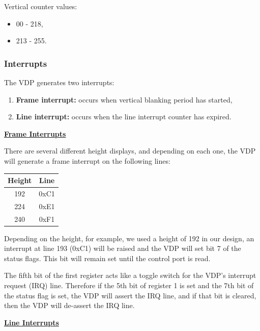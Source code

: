 \documentclass{article}
\begin{document}
Vertical counter values:

\vspace{-0.1cm}
\begin{itemize}
    \item 00  - 218,
    \item 213 - 255.
\end{itemize}

\subsubsection{Interrupts}

The VDP generates two interrupts:

\vspace{-0.1cm}
\begin{enumerate}
    \item \textbf{Frame interrupt:} occurs when vertical blanking period has started,
    \item \textbf{Line interrupt:} occurs when the line interrupt counter has expired.
\end{enumerate}

\textbf{\underline{Frame Interrupts }}

There are several different height displays, and depending on each one, the VDP will
generate a frame interrupt on the following lines:

\begin{table}[H]
    \centering
    \begin{tabular}{c|c}
        Height  & Line \\ \hline \hline
        192     & 0xC1 \\
        224     & 0xE1 \\
        240     & 0xF1 \\
    \end{tabular}
\end{table}

Depending on the height, for example, we used a height of 192 in our design, an
interrupt at line 193 (0xC1) will be raised and the VDP will set bit 7 of the status
flags. This bit will remain set until the control port is read.

The fifth bit of the first register acts like a toggle switch for the VDP's interrupt
request (IRQ) line. Therefore if the 5th bit of register 1 is set and the 7th bit of
the status flag is set, the VDP will assert the IRQ line, and if that bit is cleared,
then the VDP will de-assert the IRQ line.

\textbf{\underline{Line Interrupts }}
\end{document}
